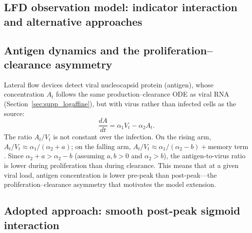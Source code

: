 \begin{appendix}
\section{LFD observation model: indicator interaction and alternative approaches}
\label{sec:supp_lfd_deriv}

\subsection{Antigen dynamics and the proliferation--clearance asymmetry}

Lateral flow devices detect viral nucleocapsid protein (antigen), whose concentration $A_t$ follows the same production--clearance ODE as viral RNA (Section~\ref{sec:supp_logaffine}), but with virus rather than infected cells as the source:
\begin{equation*}
    \frac{dA}{dt} = \alpha_1 V_t - \alpha_2 A_t.
\end{equation*}
The ratio $A_t / V_t$ is not constant over the infection. On the rising arm, $A_t / V_t \approx \alpha_1 / (\alpha_2 + a)$; on the falling arm, $A_t / V_t \approx \alpha_1 / (\alpha_2 - b) + \text{memory term}$. Since $\alpha_2 + a > \alpha_2 - b$ (assuming $a, b > 0$ and $\alpha_2 > b$), the antigen-to-virus ratio is lower during proliferation than during clearance. This means that at a given viral load, antigen concentration is lower pre-peak than post-peak---the proliferation--clearance asymmetry that motivates the model extension.

\subsection{Adopted approach: smooth post-peak sigmoid interaction}


\end{appendix}
